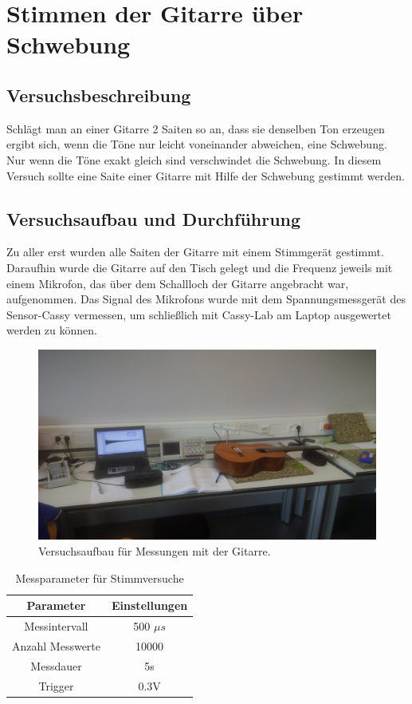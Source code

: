 \documentclass[12pt,a4paper]{article}
\begin{document}
\section{Stimmen der Gitarre über Schwebung}
\subsection{Versuchsbeschreibung}
Schlägt man an einer Gitarre 2 Saiten so an, dass sie denselben Ton erzeugen ergibt sich, wenn die Töne nur leicht voneinander abweichen, eine Schwebung. Nur wenn die Töne exakt gleich sind verschwindet die Schwebung. \newline
In diesem Versuch sollte eine Saite einer Gitarre mit Hilfe der Schwebung gestimmt werden.
\subsection{Versuchsaufbau und Durchführung}

Zu aller erst wurden alle Saiten der Gitarre mit einem Stimmgerät gestimmt.  \newline
Daraufhin wurde die Gitarre auf den Tisch gelegt und die Frequenz jeweils mit einem Mikrofon, das über dem Schallloch der Gitarre angebracht war, aufgenommen. Das Signal des Mikrofons wurde mit dem Spannungsmessgerät des Sensor-Cassy vermessen, um schließlich mit Cassy-Lab am Laptop ausgewertet werden zu können.

\begin{figure}[H]
\centering
\includegraphics[scale=0.1]{Bilder/IMG_20160323_123920.jpg}
\caption{Versuchsaufbau für Messungen mit der Gitarre. }
\end{figure}


\begin{table}[H]\centering
\caption{Messparameter für Stimmversuche}
\begin{tabular}{c|c}
Parameter & Einstellungen \\ 
\hline
Messintervall & 500 $\mu s$ \\ 
Anzahl Messwerte & 10000 \\ 
Messdauer & 5s \\ 
Trigger & 0.3V \\ 
\end{tabular}
\end{table}
 
\end{document}
